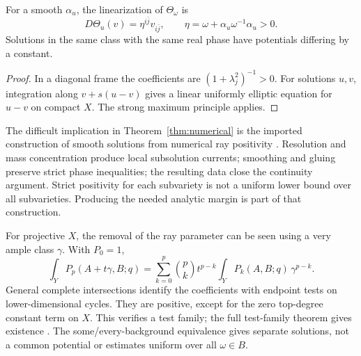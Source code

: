 \documentclass[12pt,reqno]{amsart}
\begin{document}
\begin{lemma}\label{lem:unique}
For a smooth $\alpha_u$, the linearization of $\Theta_\omega$ is
\[
 D\Theta_u(v)=\eta^{i\bar j}v_{i\bar j},\qquad
 \eta=\omega+\alpha_u\omega^{-1}\alpha_u>0.
\]
Solutions in the same class with the same real phase have potentials differing by a constant.
\end{lemma}
\begin{proof}\label{proof:unique}
In a diagonal frame the coefficients are $(1+\lambda_j^2)^{-1}>0$.
For solutions $u,v$, integration along $v+s(u-v)$ gives a linear uniformly elliptic equation for $u-v$ on compact $X$. The strong maximum principle applies.
\end{proof}

The difficult implication in Theorem~\ref{thm:numerical} is the imported construction of smooth solutions from numerical ray positivity \cite[Sections 3--7]{CLT}.
Resolution and mass concentration produce local subsolution currents; smoothing and gluing preserve strict phase inequalities; the resulting data close the continuity argument.
Strict positivity for each subvariety is not a uniform lower bound over all subvarieties. Producing the needed analytic margin is part of that construction.

For projective $X$, the removal of the ray parameter can be seen using a very ample class $\gamma$. With $P_0=1$,
\[
 \int_Y P_p(A+t\gamma,B;q)
 =\sum_{k=0}^p\binom pk t^{p-k}
       \int_Y P_k(A,B;q)\,\gamma^{p-k}.
\]
General complete intersections identify the coefficients with endpoint tests on lower-dimensional cycles. They are positive, except for the zero top-degree constant term on $X$. This verifies a test family; the full test-family theorem gives existence \cite[Section 2, Corollary 1.5]{CLT}.
The some/every-background equivalence gives separate solutions, not a common potential or estimates uniform over all $\omega\in B$.
\end{document}
